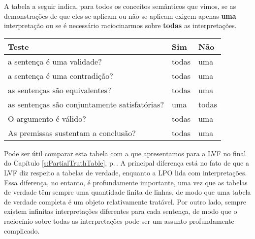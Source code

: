 A tabela a seguir indica, para todos os conceitos semânticos que vimos, se as demonstrações de que eles se aplicam ou não se aplicam exigem apenas \textbf{uma} interpretação ou se é necessário raciocinarmos sobre \textbf{todas} as interpretações.

\begin{center} %
\begin{tabular}{l l l}
\cline{1-3}
\textbf{Teste} & \textbf{Sim} & \textbf{Não}\\
 \hline
\cline{1-3}
a sentença é uma validade? & todas & uma \\
a sentença é uma contradição? &  todas  & uma \\
as sentenças são equivalentes? & todas & uma \\
as sentenças são conjuntamente satisfatórias? & uma & todas \\
O argumento é válido? & todas & uma \\
As premissas sustentam a conclusão? & todas & uma \\
\cline{1-3}
\end{tabular}
\end{center}
\label{table.ModelOrArgument}




Pode ser útil comparar esta tabela com a que apresentamos para a LVF no final do Capítulo \ref{s:PartialTruthTable}, p.\,\pageref{t:TruthTable}.
A principal diferença está no fato de que a LVF diz respeito a tabelas de verdade, enquanto a LPO lida com interpretações.
Essa diferença, no entanto, é profundamente importante, uma vez que as tabelas de verdade têm sempre uma quantidade finita de linhas, de modo que uma tabela de verdade completa é um objeto relativamente tratável.
Por outro lado, sempre existem infinitas interpretações diferentes para cada sentença, de modo que o raciocínio sobre todas as interpretações pode ser um assunto profundamente complicado.
